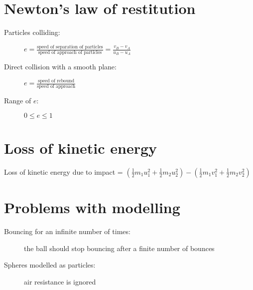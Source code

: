 \section{Newton's law of restitution}
\begin{description}
    \item[Particles colliding:] $e=
    \frac{\text{speed of separation of particles}}{\text{speed of approach of particles}}
    =\frac{v_B-v_A}{u_B-u_A}$
    \item[Direct collision with a smooth plane:] $e=\frac{\text{speed of rebound}}{\text{speed of approach}}$
    \item[Range of $e$:] $0 \leq e \leq 1$
\end{description}

\section{Loss of kinetic energy}
Loss of kinetic energy due to impact = $(\frac{1}{2}m_1u_1^2+\frac{1}{2}m_2u_2^2)-(\frac{1}{2}m_1v_1^2+\frac{1}{2}m_2v_2^2)$

\section{Problems with modelling} %
\begin{description}
    \item[Bouncing for an infinite number of times:] the ball should stop bouncing after a finite number of bounces
    \item[Spheres modelled as particles:] air resistance is ignored
\end{description}